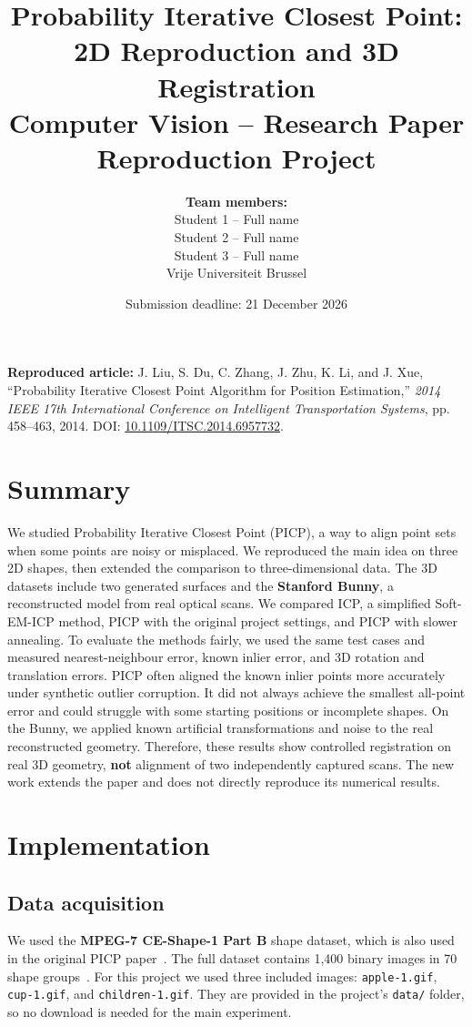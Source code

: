 \documentclass[11pt,a4paper]{article}
\title{\textbf{Probability Iterative Closest Point: 2D Reproduction and 3D Registration}\\[4pt]
       \large Computer Vision -- Research Paper Reproduction Project}
\author{\textbf{Team members:}\\
        Student 1 -- Full name\\
        Student 2 -- Full name\\
        Student 3 -- Full name\\[5pt]
        Vrije Universiteit Brussel}
\date{Submission deadline: 21 December 2026}
\begin{document}
\maketitle
\vspace{-4mm}

\begin{center}
\textbf{Reproduced article:} J. Liu, S. Du, C. Zhang, J. Zhu, K. Li, and J. Xue,
``Probability Iterative Closest Point Algorithm for Position Estimation,''
\emph{2014 IEEE 17th International Conference on Intelligent Transportation Systems},
pp. 458--463, 2014. DOI: \href{https://doi.org/10.1109/ITSC.2014.6957732}{10.1109/ITSC.2014.6957732}.
\end{center}

\section{Summary}
We studied Probability Iterative Closest Point (PICP), a way to align point
sets when some points are noisy or misplaced. We reproduced the main idea on
three 2D shapes, then extended the comparison to three-dimensional data. The
3D datasets include two generated surfaces and the \textbf{Stanford Bunny},
a reconstructed model from real optical scans. We compared ICP, a simplified
Soft-EM-ICP method, PICP with the original project settings, and PICP with
slower annealing. To evaluate the methods fairly, we used the same test cases
and measured nearest-neighbour error, known inlier error, and 3D rotation and
translation errors. PICP often aligned the known inlier points more accurately
under synthetic outlier corruption. It did not always achieve the smallest
all-point error and could struggle with some starting positions or incomplete
shapes. On the Bunny, we applied known artificial transformations and noise
to the real reconstructed geometry. Therefore, these results show controlled
registration on real 3D geometry, \textbf{not} alignment of two independently
captured scans. The new work extends the paper and does not directly reproduce
its numerical results.

\section{Implementation}

\subsection{Data acquisition}
We used the \textbf{MPEG-7 CE-Shape-1 Part B} shape dataset, which is also used
in the original PICP paper~\cite{liu2014}. The full dataset contains 1,400
binary images in 70 shape groups~\cite{dataset}. For this project we used three
included images: \texttt{apple-1.gif}, \texttt{cup-1.gif}, and
\texttt{children-1.gif}. They are provided in the project's \texttt{data/}
folder, so no download is needed for the main experiment.
\end{document}
